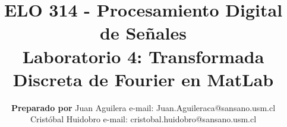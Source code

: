 \documentclass[letterpaper,onecolumn,10pt,journal,final]{IEEEtran}
\begin{document}
\title{ELO 314 - Procesamiento Digital de Señales\\ Laboratorio 4: Transformada Discreta de Fourier en MatLab}

\author{\textbf{Preparado por}
\vspace{1 mm}Juan Aguilera e-mail: Juan.Aguileraca@sansano.usm.cl \\
            Cristóbal Huidobro e-mail: 
cristobal.huidobro@sansano.usm.cl}

\maketitle

\vspace{-1 cm}

%
%
\end{document}
